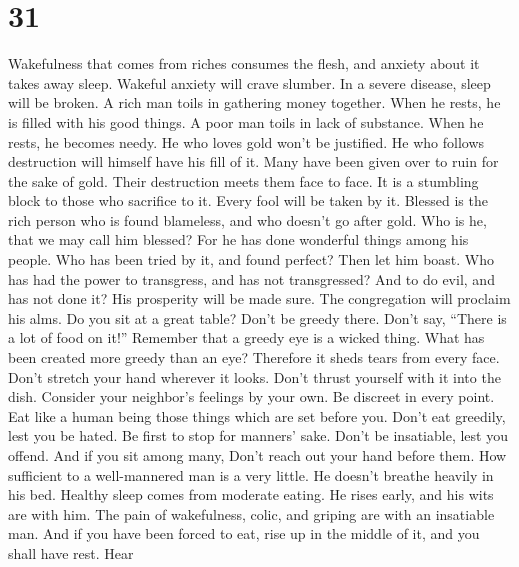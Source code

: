 \hypertarget{section-26}{%
\section{31}\label{section-26}}

 Wakefulness that comes from riches consumes the flesh,
and anxiety about it takes away sleep.  Wakeful anxiety
will crave slumber. In a severe disease, sleep will be broken.
 A rich man toils in gathering money together. When he
rests, he is filled with his good things.  A poor man
toils in lack of substance. When he rests, he becomes needy.
 He who loves gold won't be justified. He who follows
destruction will himself have his fill of it.  Many have
been given over to ruin for the sake of gold. Their destruction meets
them face to face.  It is a stumbling block to those who
sacrifice to it. Every fool will be taken by it.  Blessed
is the rich person who is found blameless, and who doesn't go after
gold.  Who is he, that we may call him blessed? For he has
done wonderful things among his people.  Who has been
tried by it, and found perfect? Then let him boast. Who has had the
power to transgress, and has not transgressed? And to do evil, and has
not done it?  His prosperity will be made sure. The
congregation will proclaim his alms.  Do you sit at a
great table? Don't be greedy there. Don't say, ``There is a lot of food
on it!''  Remember that a greedy eye is a wicked thing.
What has been created more greedy than an eye? Therefore it sheds tears
from every face.  Don't stretch your hand wherever it
looks. Don't thrust yourself with it into the dish. 
Consider your neighbor's feelings by your own. Be discreet in every
point.  Eat like a human being those things which are set
before you. Don't eat greedily, lest you be hated.  Be
first to stop for manners' sake. Don't be insatiable, lest you offend.
 And if you sit among many, Don't reach out your hand
before them.  How sufficient to a well-mannered man is a
very little. He doesn't breathe heavily in his bed. 
Healthy sleep comes from moderate eating. He rises early, and his wits
are with him. The pain of wakefulness, colic, and griping are with an
insatiable man.  And if you have been forced to eat, rise
up in the middle of it, and you shall have rest.  Hear
